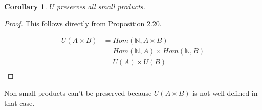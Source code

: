 \documentclass[notitlepage,a4paper]{article}
\newtheorem{corollary}{Corollary}
\begin{document}
\begin{enumerate}
    \begin{corollary}
      $U$ preserves all small products.
    \end{corollary}

    \begin{proof}

      This follows directly from Proposition 2.20.

      \begin{align*}
       U(A \times B) &= Hom(\mathbb{N}, A \times B) \\
                     &= Hom(\mathbb{N}, A) \times Hom(\mathbb{N}, B) \\
                     &= U(A) \times U(B) \\
      \end{align*}

    \end{proof}

      Non-small products can't be preserved because $U(A \times B)$
      is not well defined in that case.

\end{enumerate}
\end{document}
